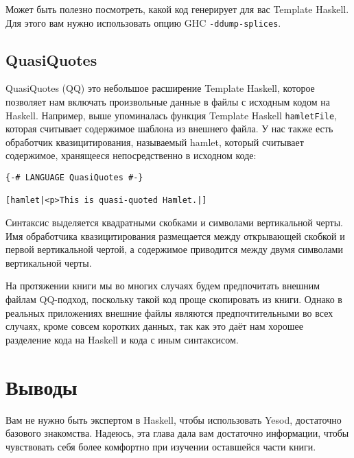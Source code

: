 Может быть полезно посмотреть, какой код генерирует для вас Template Haskell. Для этого вам нужно использовать опцию GHC \texttt{-ddump-splices}.


\subsection{QuasiQuotes}

QuasiQuotes (QQ) это небольшое расширение Template Haskell, которое позволяет нам включать произвольные данные в файлы с исходным кодом на Haskell. Например, выше упоминалась функция Template Haskell \lstinline'hamletFile', которая считывает содержимое шаблона из внешнего файла. У нас также есть обработчик квазицитирования, называемый hamlet, который считывает содержимое, хранящееся непосредственно в исходном коде:

\begin{lstlisting}
{-# LANGUAGE QuasiQuotes #-}

[hamlet|<p>This is quasi-quoted Hamlet.|]
\end{lstlisting}

Синтаксис выделяется квадратными скобками и символами вертикальной черты. Имя обработчика квазицитирования размещается между открывающей скобкой и первой вертикальной чертой, а содержимое приводится между двумя символами вертикальной черты.

На протяжении книги мы во многих случаях будем предпочитать внешним файлам QQ-подход, поскольку такой код проще скопировать из книги. Однако в реальных приложениях внешние файлы являются предпочтительными во всех случаях, кроме совсем коротких данных, так как это даёт нам хорошее разделение кода на Haskell и кода с иным синтаксисом.

\section{Выводы}

Вам не нужно быть экспертом в Haskell, чтобы использовать Yesod, достаточно базового знакомства. Надеюсь, эта глава дала вам достаточно информации, чтобы чувствовать себя более комфортно при изучении оставшейся части книги.
